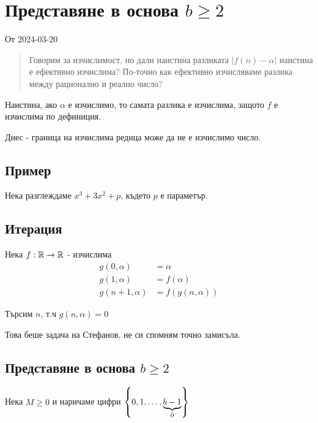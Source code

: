 \section{Представяне в основа $b \geq 2$}
От 2024-03-20
\begin{quote}
    Говорим за изчислимост, но дали наистина разликата $|f(n) - \alpha|$ наистина е ефективно изчислима? По-точно как ефективно изчисляваме разлика между рационално и реално число?
\end{quote}
Наистина, ако $\alpha$ е изчислимо, то самата разлика е изчислима, защото $f$ е изчислима по дефиниция.

Днес - граница на изчислима редица може да не е изчислимо число.

\subsection{Пример}
Нека разглеждаме $x^3 + 3x^2 + p$, където $p$ е параметър.

\subsection{Итерация}
\begin{notation}
    Нека $f: {\mathbb{R}} \to {\mathbb{R}}$ - изчислима
    \begin{equation*}
        \begin{split}
            g(0, \alpha) &= \alpha \\
            g(1, \alpha) &= f(\alpha) \\
            g(n+1, \alpha) &= f(g(n, \alpha))
        \end{split}
    \end{equation*}
\end{notation}
\begin{problem}
    Търсим $n$, т.ч $g(n, \alpha) = 0$
\end{problem}
\begin{solution}
    Това беше задача на Стефанов, не си спомням точно замисъла.
\end{solution}

\subsection{Представяне в основа $b \geq 2$}
Нека $M \geq 0$ и наричаме цифри $\left\{0, 1, \dots, \underbrace{b-1}_{\Bar{0}}\right\}$

